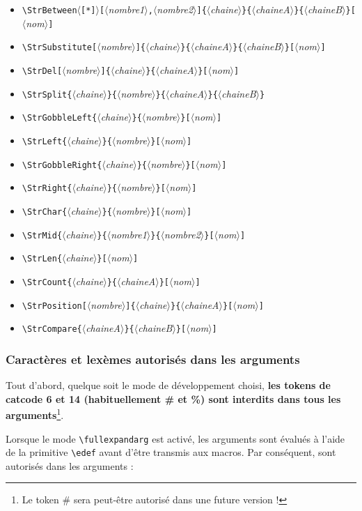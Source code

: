 \documentclass[a4paper,10pt,french]{article}
\newcommand\argu[1]{$\langle$\textit{#1}$\rangle$}
\newcommand\ARGU[1]{\texttt{\color{black}\{}\argu{#1}\texttt{\color{black}\}}}
\newcommand\arguC[1]{\texttt{\color{black}[}\argu{#1}\texttt{\color{black}]}}
\newcommand\arguCC[2]{\texttt{\color{black}[}\argu{#1}\texttt{\color{black},}\argu{#2}\texttt{\color{black}]}}
\newcommand\etoile{$\langle$\texttt{[*]}$\rangle$}
\newcommand\verbinline{\lstinline[basicstyle=\normalsize\ttfamily]}
\newcommand\colorise{\color{violet}}
\begin{document}
\begin{itemize}
	\item\verb|\StrBetween|\etoile{\colorise\arguCC{nombre1}{nombre2}\ARGU{chaine}\ARGU{chaineA}\ARGU{chaineB}}\arguC{nom}
	\item\verb|\StrSubstitute|{\colorise\arguC{nombre}\ARGU{chaine}\ARGU{chaineA}\ARGU{chaineB}}\arguC{nom}
	\item\verb|\StrDel|{\colorise\arguC{nombre}\ARGU{chaine}\ARGU{chaineA}}\arguC{nom}
	\item\verb|\StrSplit|{\colorise\ARGU{chaine}\ARGU{nombre}}\ARGU{chaineA}\ARGU{chaineB}
	\item\verb|\StrGobbleLeft|{\colorise\ARGU{chaine}\ARGU{nombre}}\arguC{nom}
	\item\verb|\StrLeft|{\colorise\ARGU{chaine}\ARGU{nombre}}\arguC{nom}
	\item\verb|\StrGobbleRight|{\colorise\ARGU{chaine}\ARGU{nombre}}\arguC{nom}
	\item\verb|\StrRight|{\colorise\ARGU{chaine}\ARGU{nombre}}\arguC{nom}
	\item\verb|\StrChar|{\colorise\ARGU{chaine}\ARGU{nombre}}\arguC{nom}
	\item\verb|\StrMid|{\colorise\ARGU{chaine}\ARGU{nombre1}\ARGU{nombre2}}\arguC{nom}
	\item\verb|\StrLen|{\colorise\ARGU{chaine}}\arguC{nom}
	\item\verb|\StrCount|{\colorise\ARGU{chaine}\ARGU{chaineA}}\arguC{nom}
	\item\verb|\StrPosition|{\colorise\arguC{nombre}\ARGU{chaine}\ARGU{chaineA}}\arguC{nom}
	\item\verb|\StrCompare|{\colorise\ARGU{chaineA}\ARGU{chaineB}}\arguC{nom}
\end{itemize}
\parindent0pt

\subsubsection{Caractères et lexèmes autorisés dans les arguments}
Tout d'abord, quelque soit le mode de développement choisi, \textbf{les tokens de catcode 6 et 14 (habituellement {\ttfamily\#} et {\ttfamily\%}) sont interdits dans tous les arguments}\footnote{Le token {\ttfamily\#} sera peut-être autorisé dans une future version !}.\bigskip

Lorsque le mode \verbinline|\fullexpandarg| est activé, les arguments sont évalués à l'aide de la primitive \verb|\edef| avant d'être transmis aux macros. Par conséquent, sont autorisés dans les arguments :
\end{document}
